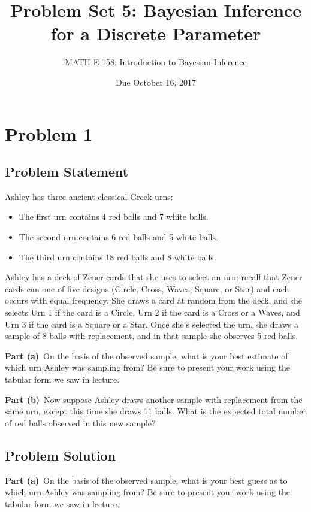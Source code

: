 \documentclass[12pt]{article}
\title{Problem Set 5: Bayesian Inference for a Discrete Parameter}
\author{MATH E-158: Introduction to Bayesian Inference}
\date{Due October 16, 2017}
\theoremstyle{definition}
\begin{document}
	
	\maketitle


\section*{Problem 1}


\subsection*{Problem Statement}

Ashley has three ancient classical Greek urns:
\begin{itemize}
	\item The first urn contains 4 red balls and 7 white balls.
	\item The second urn contains 6 red balls and 5 white balls.
	\item The third urn contains 18 red balls and 8 white balls.
\end{itemize}
Ashley has a deck of Zener cards that she uses to select an urn; recall that Zener cards can one of five designs (Circle, Cross, Waves, Square, or Star) and each occurs with equal frequency. She draws a card at random from the deck, and she selects Urn 1 if the card is a Circle, Urn 2 if the card is a Cross or a Waves, and Urn 3 if the card is a Square or a Star. Once she's selected the urn, she draws a sample of 8 balls with replacement, and in that sample she observes 5 red balls.

\bigskip
\noindent
{\bf Part (a)}\ On the basis of the observed sample, what is your best estimate of which urn Ashley was sampling from? Be sure to present your work using the tabular form we saw in lecture.

\bigskip
\noindent
{\bf Part (b)}\ Now suppose Ashley draws another sample with replacement from the same urn, except this time she draws 11 balls. What is the expected total number of red balls observed in this new sample?

\newpage
\subsection*{Problem Solution}

\noindent
{\bf Part (a)}\ On the basis of the observed sample, what is your best guess as to which urn Ashley was sampling from? Be sure to present your work using the tabular form we saw in lecture.
\end{document}
